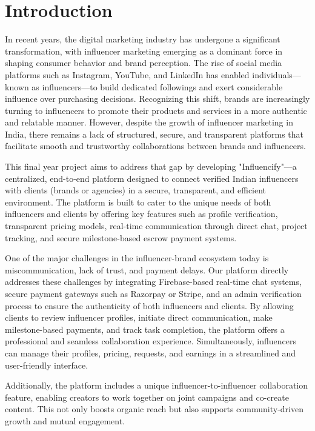 \chapter{Introduction}
\begin{justify}
In recent years, the digital marketing industry has undergone a significant transformation, with influencer marketing emerging as a dominant force in shaping consumer behavior and brand perception. The rise of social media platforms such as Instagram, YouTube, and LinkedIn has enabled individuals—known as influencers—to build dedicated followings and exert considerable influence over purchasing decisions. Recognizing this shift, brands are increasingly turning to influencers to promote their products and services in a more authentic and relatable manner. However, despite the growth of influencer marketing in India, there remains a lack of structured, secure, and transparent platforms that facilitate smooth and trustworthy collaborations between brands and influencers.
\par
This final year project aims to address that gap by developing "Influencify"—a centralized, end-to-end platform designed to connect verified Indian influencers with clients (brands or agencies) in a secure, transparent, and efficient environment. The platform is built to cater to the unique needs of both influencers and clients by offering key features such as profile verification, transparent pricing models, real-time communication through direct chat, project tracking, and secure milestone-based escrow payment systems.
\par
One of the major challenges in the influencer-brand ecosystem today is miscommunication, lack of trust, and payment delays. Our platform directly addresses these challenges by integrating Firebase-based real-time chat systems, secure payment gateways such as Razorpay or Stripe, and an admin verification process to ensure the authenticity of both influencers and clients. By allowing clients to review influencer profiles, initiate direct communication, make milestone-based payments, and track task completion, the platform offers a professional and seamless collaboration experience. Simultaneously, influencers can manage their profiles, pricing, requests, and earnings in a streamlined and user-friendly interface.
\par
Additionally, the platform includes a unique influencer-to-influencer collaboration feature, enabling creators to work together on joint campaigns and co-create content. This not only boosts organic reach but also supports community-driven growth and mutual engagement.

\end{justify}

